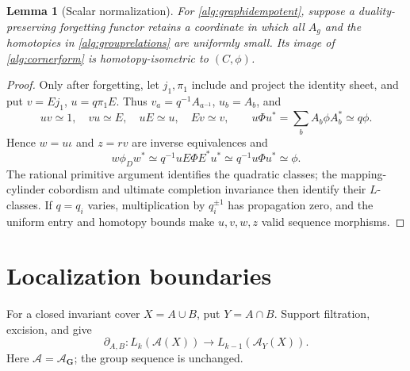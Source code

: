 \documentclass[11pt]{amsart}
\numberwithin{equation}{section}
\newtheorem{lemma}[lemma]{Lemma}
\theoremstyle{definition}
\theoremstyle{remark}
\begin{document}
\begin{lemma}[Scalar normalization]\label{alg:normalization}
For \eqref{alg:graphidempotent}, suppose a duality-preserving forgetting
functor retains a coordinate in which all $A_g$ and the homotopies in
\eqref{alg:grouprelations} are uniformly small. Its image of
\eqref{alg:cornerform} is homotopy-isometric to $(C,\phi)$.
\end{lemma}
\begin{proof}
Only after forgetting, let $j_1,\pi_1$ include and project the identity
sheet, and put $v=Ej_1$, $u=q\pi_1E$. Thus
$v_a=q^{-1}A_{a^{-1}}$, $u_b=A_b$, and
\begin{equation}\label{alg:uvrelations}
 uv\simeq1,\quad vu\simeq E,\quad uE\simeq u,\quad Ev\simeq v,
 \qquad u\Phi u^*=\sum_bA_b\phi A_b^*\simeq q\phi.
\end{equation}
Hence $w=u\iota$ and $z=rv$ are inverse equivalences and
\begin{equation}\label{alg:scalarisometry}
 w\phi_Dw^*\simeq q^{-1}uE\Phi E^*u^*
              \simeq q^{-1}u\Phi u^*\simeq\phi.
\end{equation}
The rational primitive argument identifies the quadratic classes;
the mapping-cylinder cobordism and ultimate completion invariance then
identify their $L$-classes. If $q=q_i$ varies, multiplication by
$q_i^{\pm1}$ has propagation zero, and the uniform entry and homotopy
bounds make $u,v,w,z$ valid sequence morphisms.
\end{proof}

\section{Localization boundaries}\label{sec:localization}
For a closed invariant cover $X=A\cup B$, put $Y=A\cap B$.
Support filtration, excision, and \cite[Theorem 4.2]{CP95} give
\begin{equation}\label{eq:ordinary-boundary}
 \partial_{A,B}:L_k(\mathcal A(X))\longrightarrow
                    L_{k-1}(\mathcal A_Y(X)).
\end{equation}
Here $\mathcal A=\mathcal A_{\mathbf G}$; the group sequence is unchanged.
\end{document}

